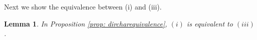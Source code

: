 \documentclass[11pt]{amsart}
\newtheorem{lemma}{Lemma}[section]
\theoremstyle{definition}
\DeclareMathOperator*{\E}{\mathbb{E}}
\newcommand{\C}{{\mathbb C}}
\newcommand{\NN}{{\mathcal N}}
\begin{document}
 


Next we show the equivalence between (i) and (iii).
\begin{lemma}\label{lem: dircharequivalence}
In Proposition \ref{prop: dircharequivalence}, $(i)$ is equivalent to $(iii)$.
\end{lemma}

 
\end{document}
